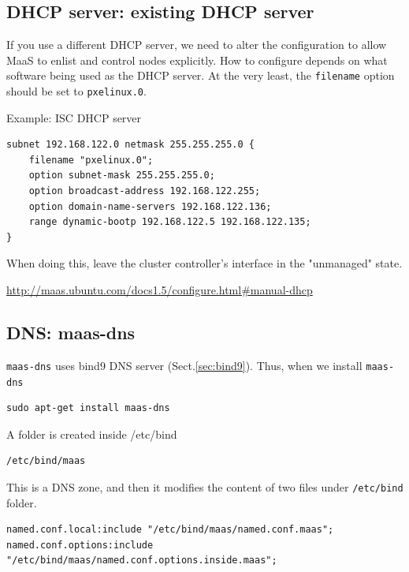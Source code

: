 \subsection{DHCP server: existing DHCP server}
\label{sec:MaaS_use-existing-DHCP-server}

If you use a different DHCP server, we need to alter the configuration to allow
MaaS to enlist and control nodes explicitly. How to configure depends on what
software being used as the DHCP server. At the very least, the \verb!filename!
option should be set to \verb!pxelinux.0!. 

Example: ISC DHCP server
\begin{verbatim}
subnet 192.168.122.0 netmask 255.255.255.0 {
    filename "pxelinux.0";
    option subnet-mask 255.255.255.0;
    option broadcast-address 192.168.122.255;
    option domain-name-servers 192.168.122.136;
    range dynamic-bootp 192.168.122.5 192.168.122.135;
}
\end{verbatim}
When doing this, leave the cluster controller's interface in the "unmanaged"
state.

\url{http://maas.ubuntu.com/docs1.5/configure.html\#manual-dhcp}


\subsection{DNS: maas-dns}
\label{sec:MaaS_maas-dns}

\verb!maas-dns! uses bind9 DNS server (Sect.\ref{sec:bind9}). Thus, when we
install \verb!maas-dns!
\begin{verbatim}
sudo apt-get install maas-dns
\end{verbatim}

A folder is created inside /etc/bind
\begin{verbatim}
/etc/bind/maas
\end{verbatim}
This is a DNS zone, and then it modifies the content of two files
under \verb!/etc/bind! folder.
\begin{verbatim}
named.conf.local:include "/etc/bind/maas/named.conf.maas";
named.conf.options:include "/etc/bind/maas/named.conf.options.inside.maas";
\end{verbatim}

